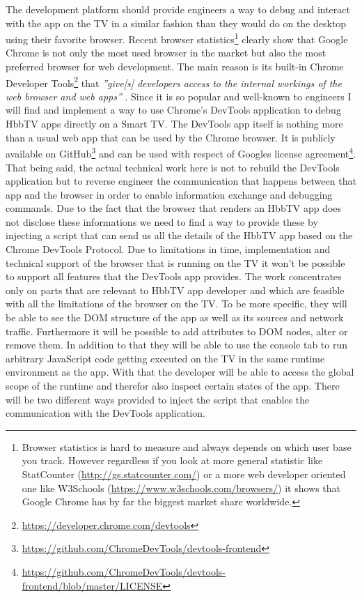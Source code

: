 The development platform should provide engineers a way to debug and interact with the app on the TV in a similar fashion than they would do on the desktop using their favorite browser. Recent browser statistics\footnote{Browser statistics is hard to measure and always depends on which user base you track. However regardless if you look at more general statistic like StatCounter (\url{http://gs.statcounter.com/}) or a more web developer oriented one like W3Schools (\url{https://www.w3schools.com/browsers/}) it shows that Google Chrome has by far the biggest market share worldwide.} clearly show that Google Chrome is not only the most used browser in the market but also the most preferred browser for web development. The main reason is its built-in Chrome Developer Tools\footnote{\url{https://developer.chrome.com/devtools}} that \textit{''give[s] developers access to the internal workings of the web browser and web apps''} \cite{devtools}. Since it is so popular and well-known to engineers I will find and implement a way to use Chrome's DevTools application to debug HbbTV apps directly on a Smart TV. The DevTools app itself is nothing more than a usual web app that can be used by the Chrome browser. It is publicly available on GitHub\footnote{\url{https://github.com/ChromeDevTools/devtools-frontend}} and can be used with respect of Googles license agreement\footnote{\url{https://github.com/ChromeDevTools/devtools-frontend/blob/master/LICENSE}}. That being said, the actual technical work here is not to rebuild the DevTools application but to reverse engineer the communication that happens between that app and the browser in order to enable information exchange and debugging commands. Due to the fact that the browser that renders an HbbTV app does not disclose these informations we need to find a way to provide these by injecting a script that can send us all the details of the HbbTV app based on the Chrome DevTools Protocol. Due to limitations in time, implementation and technical support of the browser that is running on the TV it won't be possible to support all features that the DevTools app provides. The work concentrates only on parts that are relevant to HbbTV app developer and which are feasible with all the limitations of the browser on the TV. To be more specific, they will be able to see the DOM structure of the app as well as its sources and network traffic. Furthermore it will be possible to add attributes to DOM nodes, alter or remove them. In addition to that they will be able to use the console tab to run arbitrary JavaScript code getting executed on the TV in the same runtime environment as the app. With that the developer will be able to access the global scope of the runtime and therefor also inspect certain states of the app. There will be two different ways provided to inject the script that enables the communication with the DevTools application.

